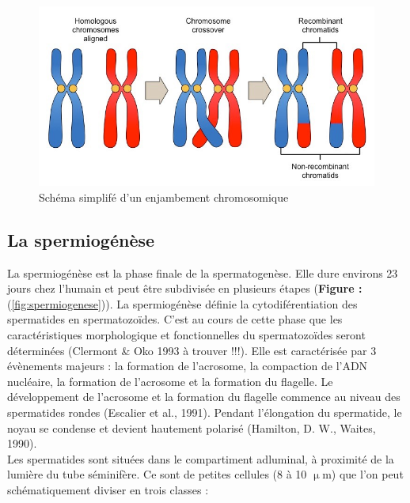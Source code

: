 \documentclass[12pt,twoside]{reedthesis}
\theoremstyle{definition}
\theoremstyle{definition}
\theoremstyle{remark}
\begin{document}
  \begin{figure}
  
  {\centering \includegraphics[scale=0.35]{figure/crossingover} 
  
  }
  
  \caption{Schéma simplifé d'un enjambement chromosomique}\label{fig:crossingover}
  \end{figure}
  
  \subsection{La spermiogénèse}\label{la-spermiogenese}
  
  La spermiogénèse est la phase finale de la spermatogenèse. Elle dure
  environs 23 jours chez l'humain et peut être subdivisée en plusieurs
  étapes (\textbf{Figure : }(\ref{fig:spermiogenese})). La spermiogénèse
  définie la cytodiférentiation des spermatides en spermatozoïdes. C'est
  au cours de cette phase que les caractéristiques morphologique et
  fonctionnelles du spermatozoïdes seront déterminées (Clermont \& Oko
  1993 à trouver !!!). Elle est caractérisée par 3 évènements majeurs : la
  formation de l'acrosome, la compaction de l'ADN nucléaire, la formation
  de l'acrosome et la formation du flagelle. Le développement de
  l'acrosome et la formation du flagelle commence au niveau des
  spermatides rondes (Escalier et al., 1991). Pendant l'élongation du
  spermatide, le noyau se condense et devient hautement polarisé
  (Hamilton, D. W., Waites, 1990).\\
  Les spermatides sont situées dans le compartiment adluminal, à proximité
  de la lumière du tube séminifère. Ce sont de petites cellules (8 à 10
  \(\upmu\)m) que l'on peut schématiquement diviser en trois classes :
  
\end{document}
